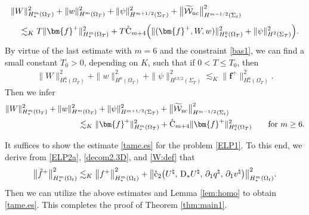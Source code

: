 \documentclass[twoside,11pt]{article}
\numberwithin{equation}{section}
\def\p{\partial}
\begin{document}
\begin{align}
	\nonumber
&	\|W\|_{H_*^m(\Omega_{T})}^2	+	\|w\|_{H^m(\Omega_{T})}^2	+ \|\psi \|_{H^{m+1/2}(\Sigma_{T})}^2
+\big\| \widetilde{\mathcal{W}}_{\rm nc} \big\|_{H^{m-1/2}(\Sigma_{t})}^2
\\[1mm]
\nonumber	
&\quad \lesssim_K
	T{\|} \bm{f}^+ {\|}_{H_*^m(\Omega_{T})}^2
	+T\mathring{\rm C}_{m+4} \Big(\|(\bm{f}^+,W,w)\|_{H_*^{6}(\Omega_{T})}^2+\|\psi\|_{H^2(\Sigma_{T})}^2\Big)
.
\end{align}
By virtue of the last estimate with $m=6$ and the constraint \eqref{bas1}, we can find a small constant $T_0>0$, depending on $K$, such that if $0<T\leq T_0$, then
\begin{align}
	\nonumber
 \|W\|_{H_*^6(\Omega_{T})}^2	+	\|w\|_{H^6(\Omega_{T})}^2	+ \|\psi \|_{H^{13/2}(\Sigma_{T})}^2
  \lesssim_K
  {\|} \bm{f}^+ {\|}_{H_*^6(\Omega_{T})}^2.
\end{align}
Then we infer
\begin{align}\nonumber
 &\|W\|_{H_*^m(\Omega_{T})}^2	+	\|w\|_{H^m(\Omega_{T})}^2	+ \|\psi \|_{H^{m+1/2}(\Sigma_{T})}^2
 +\big\| \widetilde{\mathcal{W}}_{\rm nc} \big\|_{H^{m-1/2}(\Sigma_{t})}^2
 \\
&\hspace*{9em}\lesssim_K
{\|} \bm{f}^+ {\|}_{H_*^m(\Omega_{T})}^2+\mathring{\rm C}_{m+4} \| \bm{f}^+ \|_{H_*^{6}(\Omega_{T})}^2
\qquad\textrm{for }m\geq 6.
\label{es:pr}
\end{align}	

	
It suffices to show the estimate \eqref{tame.es} for the problem \eqref{ELP1}.
To this end, we derive from \eqref{ELP2a},
\eqref{decom2.3D}, and \eqref{W:def} that
\begin{align*}
	\big\|\tilde{f}^+\big\|^2_{H^m_*(\Omega_{t})}
	\lesssim_K \big\| {f}^+\big\|^2_{H^m_*(\Omega_{t})}
	+\big\| \mathring{\rm c}_2 \big(U^{\natural},\, \mathrm{D}_*U^{\natural},\, \p_1q^{\natural},\, \p_1v^{\natural}   \big)\big\|^2_{H^m_*(\Omega_{t})}.
\end{align*}
Then we can utilize the above estimates and Lemma \ref{lem:homo} to obtain %
\eqref{tame.es}.
This completes the proof of Theorem \ref{thm:main1}.	
	
\end{document}
